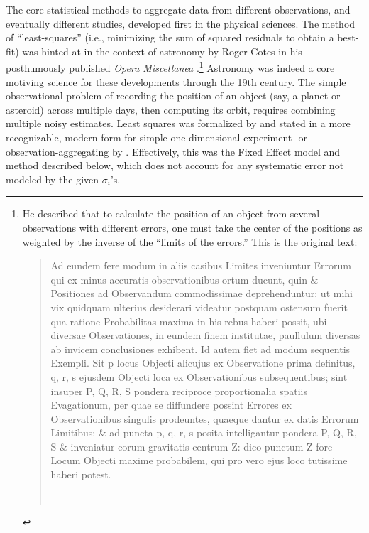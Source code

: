 \documentclass[letterpaper,12pt]{article}
\begin{document}
The core statistical methods to aggregate data from different observations, and eventually different studies, developed first in the physical sciences. The method of ``least-squares'' (i.e., minimizing the sum of squared residuals to obtain a best-fit) was hinted at in the context of astronomy by Roger Cotes in his posthumously published \emph{Opera Miscellanea} \citeyearpar{cotes1722opera}.\footnote{He described that to calculate the position of an object from several observations with different errors, one must take the center of the positions as weighted by the inverse of the ``limits of the errors.'' This is the original text:
  \begin{quote}Ad eundem fere modum in aliis casibus Limites inveniuntur Errorum qui ex minus accuratis observationibus ortum ducunt, quin \& Positiones ad Observandum commodissimae deprehenduntur: ut mihi vix quidquam ulterius desiderari videatur postquam ostensum fuerit qua ratione Probabilitas maxima in his rebus haberi possit, ubi diversae Observationes, in eundem finem institutae, paullulum diversas ab invicem conclusiones exhibent. Id autem fiet ad modum sequentis Exempli. Sit p locus Objecti alicujus ex Observatione prima definitus, q, r, s ejusdem Objecti loca ex Observationibus subsequentibus; sint insuper P, Q, R, S pondera reciproce proportionalia spatiis Evagationum, per quae se diffundere possint Errores ex Observationibus singulis prodeuntes, quaeque dantur ex datis Errorum Limitibus; \& ad puncta p, q, r, s posita intelligantur pondera P, Q, R, S \& inveniatur eorum gravitatis centrum Z: dico punctum Z fore Locum Objecti maxime probabilem, qui pro vero ejus loco tutissime haberi potest.
  
  \hfill-- \citet[Aestimatio Errorum in Mixta Mathesi, pg. 22]{cotes1722opera}\end{quote}}
Astronomy was indeed a core motiving science for these developments through the 19th century. The simple observational problem of recording the position of an object (say, a planet or asteroid) across multiple days, then computing its orbit, requires combining multiple noisy estimates. Least squares was formalized by \citet[art. 179]{gauss1857theory} and stated in a more recognizable, modern form for simple one-dimensional experiment- or observation-aggregating by \citet[art. 69-71]{airy1861algebraical}. Effectively, this was the Fixed Effect model and method described below, which does not account for any systematic error not modeled by the given $\sigma_i$'s.
\end{document}
